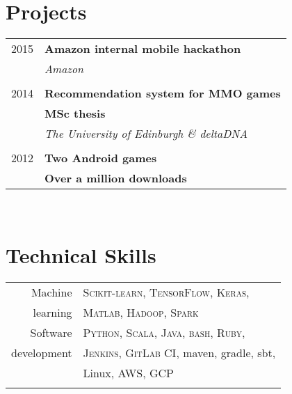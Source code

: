 \documentclass[10pt]{article} %
\begin{document}
{\begin{minipage}[t]{0.44\textwidth}

\vspace{0.5cm}
\section{Projects}

\begin{tabular}{rl}

2015     & \textbf{Amazon internal mobile hackathon}\\
& \textit{Amazon}\\
&\\
2014     & \textbf{Recommendation system for MMO games}\\
         & \textbf{MSc thesis}\\
& \textit{The University of Edinburgh \& deltaDNA}\\
&\\
2012     & \textbf{Two Android games}\\
         & \textbf{Over a million downloads}\\

\end{tabular}\\[10pt]


\vspace{0.5cm}
\section{Technical Skills}

\begin{tabular}{rl}
Machine & \textsc{Scikit-learn}, \textsc{TensorFlow}, \textsc{Keras},\\
learning & \textsc{Matlab}, \textsc{Hadoop}, \textsc{Spark}\\
\rule{0pt}{4ex}   
Software & \textsc{Python}, \textsc{Scala}, \textsc{Java}, \textsc{bash}, \textsc{Ruby},\\
development & \textsc{Jenkins}, \textsc{GitLab CI}, maven, gradle, sbt,\\
& Linux, \textsc{AWS}, \textsc{GCP}\\
& \\
\end{tabular}


\end{minipage}}
\end{document}
